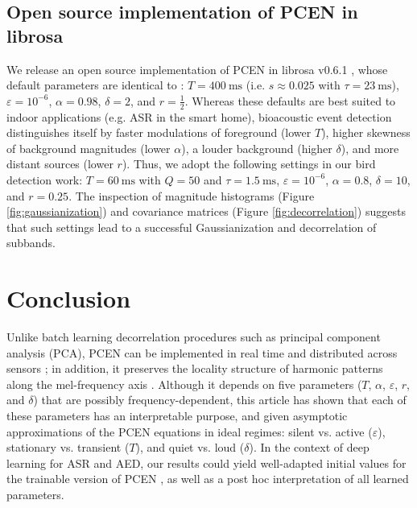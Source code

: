 \documentclass[journal]{IEEEtran}
\makeatletter
\newcommand*{\eg}{e.g.\@\xspace}
\newcommand*{\ie}{i.e.\@\xspace}
\newcommand*{\vs}{vs.\@\xspace}
\theoremstyle{remark}
\makeatother
\begin{document}
\subsection{Open source implementation of PCEN in librosa}
We release an open source implementation of PCEN in librosa v0.6.1 \cite{mcfee2018librosa061}, whose default parameters are identical to \cite{wang2017icassp}:  $T=\SI{400}{\milli\second}$ (\ie{} $s\approx0.025$ with $\tau = \SI{23}{\milli\second}$), $\varepsilon=10^{-6}$, $\alpha=0.98$, $\delta=2$, and $r=\frac{1}{2}$.
Whereas these defaults are best suited to indoor applications (\eg{} ASR in the smart home), bioacoustic event detection distinguishes itself by faster modulations of foreground (lower $T$), higher skewness of background magnitudes (lower $\alpha$), a louder background (higher $\delta$), and more distant sources (lower $r$).
Thus, we adopt the following settings in our bird detection work: $T=\SI{60}{\milli\second}$ with $Q=50$ and $\tau=\SI{1.5}{\milli\second}$, $\varepsilon=10^{-6}$, $\alpha=0.8$, $\delta=10$, and $r=0.25$.
The inspection of magnitude histograms (Figure \ref{fig:gaussianization}) and covariance matrices (Figure \ref{fig:decorrelation}) suggests that such settings lead to a successful Gaussianization and decorrelation of subbands.

\section{Conclusion}

Unlike batch learning decorrelation procedures such as principal component analysis (PCA), PCEN can be implemented in real time and distributed across sensors \cite{bello2018cacm}; in addition, it preserves the locality structure of harmonic patterns along the mel-frequency axis \cite{lostanlen2016ismir}.
Although it depends on five parameters ($T$, $\alpha$, $\varepsilon$, $r$, and $\delta$) that are possibly frequency-dependent, this article has shown that each of these parameters has an interpretable purpose, and given asymptotic approximations of the PCEN equations in ideal regimes: silent \vs{} active ($\varepsilon$), stationary \vs{} transient ($T$), and quiet \vs{} loud ($\delta$).
In the context of deep learning for ASR and AED, our results could yield well-adapted initial values for the trainable version of PCEN \cite{wang2017icassp}, as well as a post hoc interpretation of all learned parameters.
\end{document}
